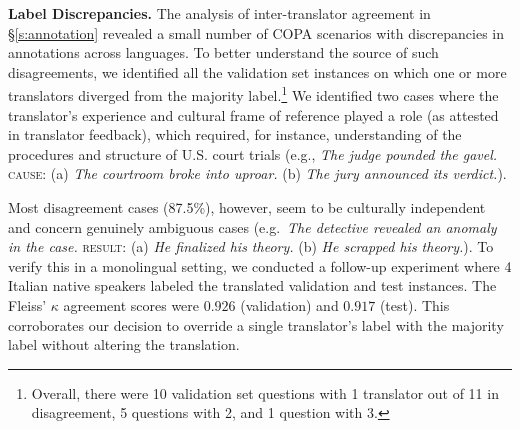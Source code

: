 \documentclass[11pt,a4paper]{article}
\begin{document}
\iffalse
\begin{table*}[!t]
    \centering
    \def\arraystretch{0.91}
    {\footnotesize
    \begin{tabularx}{1.0\textwidth}{c ccYY}
\toprule
\textsc{id} & \textsc{premise} & \textsc{question} & \textsc{choice 1} & \textsc{choice 2} \\
\cmidrule(lr){2-5}
52 & \textit{The detective revealed an anomaly in the case.}	& R(esult) &	\textit{He finalized his theory.} & \textit{He scrapped his theory.} \\
92 & \textit{The man received a parking ticket.} & C(ause) & \textit{He parallel parked on the street.} & \textit{The parking meter expired.} \\
\bottomrule
    \end{tabularx}}\vspace{-1.5mm}
    \caption{Examples in the development set with highest disagreement.}
    \label{tab:maxdisagree}
    \vspace{-1.5mm}
\end{table*}
\fi










\vspace{1.4mm}
\noindent \textbf{Label Discrepancies.}
The analysis of inter-translator agreement in \S\ref{s:annotation} revealed a small number of COPA scenarios with discrepancies in annotations across languages. To better understand the source of such disagreements, we identified all the validation set instances on which one or more translators diverged from the majority label.\footnote{Overall, there were 10 validation set questions with 1 translator out of 11 in disagreement, 5 questions with 2, and 1 question with 3. } We identified two cases where the translator's experience and cultural frame of reference played a role (as attested in translator feedback), which required, for instance, understanding of the procedures and structure of U.S. court trials (e.g., \textit{The judge pounded the gavel.} \textsc{cause}: (a) \textit{The courtroom broke into uproar.} (b) \textit{The jury announced its verdict.}). 

Most disagreement cases (87.5\%), however, seem to be culturally independent and concern genuinely ambiguous cases (e.g.\ \textit{The detective revealed an anomaly in the case.} \textsc{result}: (a) \textit{He finalized his theory.} (b) \textit{He scrapped his theory.}). To verify this in a monolingual setting, we conducted a follow-up experiment where 4 Italian native speakers labeled the translated validation and test instances. The Fleiss' $\kappa$ agreement scores were $0.926$ (validation) and $0.917$ (test).
This corroborates 
our decision to override a single translator's label with the majority label without altering the translation. 
\end{document}
